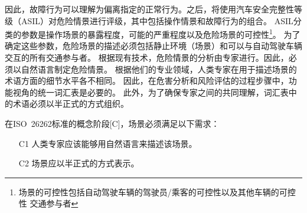 因此，故障行为可以理解为偏离指定的正常行为。之后，将使用汽车安全完整性等级（ASIL）对危险情景进行评级，其中包括操作情景和故障行为的组合。
ASIL分类的参数是操作场景的暴露程度，可能的严重程度以及危险场景的可控性\footnote{场景的可控性包括自动驾驶车辆的驾驶员/乘客的可控性以及其他车辆的可控性 交通参与者}。
为了确定这些参数，危险场景的描述必须包括静止环境（场景）和可以与自动驾驶车辆交互的所有交通参与者。
根据现有技术，危险情景的分析由专家进行。因此，必须以自然语言制定危险情景。
根据他们的专业领域，人类专家在用于描述场景的术语方面的细节水平各不相同。
因此，在危害分析和风险评估的过程步骤中，功能视角的统一词汇表是必要的。
此外，为了确保专家之间的共同理解，词汇表中的术语必须以半正式的方式组织。

在ISO~26262标准的概念阶段[C]，场景必须满足以下需求：
\begin{itemize}
	\item[C1] 人类专家应该能够用自然语言来描述该场景。
	\item[C2] 场景应以半正式的方式表示。
\end{itemize}


